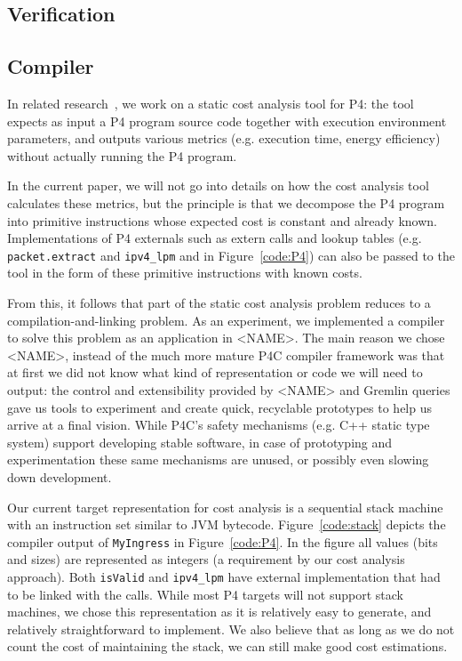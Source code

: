 \documentclass[sigconf]{acmart}
\begin{document}
	\subsection{Verification} %

  \clearpage
  \subsection{Compiler} %
  In related research~\cite{cscs18,ocs20}, we work on a static cost analysis tool for P4: the tool expects as input a P4 program source code together with execution environment parameters, and outputs various metrics (e.g. execution time, energy efficiency) without actually running the P4 program.

  In the current paper, we will not go into details on how the cost analysis tool calculates these metrics, but the principle is that we decompose the P4 program into primitive instructions whose expected cost is constant and already known. Implementations of P4 externals such as extern calls and lookup tables (e.g. \texttt{packet.extract} and \texttt{ipv4\_lpm} and in Figure~\ref{code:P4}) can also be passed to the tool in the form of these primitive instructions with known costs. 

  From this, it follows that part of the static cost analysis problem reduces to a compilation-and-linking problem. As an experiment, we implemented a compiler to solve this problem as an application in <NAME>. The main reason we chose <NAME>, instead of the much more mature P4C compiler framework was that at first we did not know what kind of representation or code we will need to output: the control and extensibility provided by <NAME> and Gremlin queries gave us tools to experiment and create quick, recyclable prototypes to help us arrive at a final vision. While P4C's safety mechanisms (e.g. C++ static type system) support developing stable software, in case of prototyping and experimentation these same mechanisms are unused, or possibly even slowing down development.

  Our current target representation for cost analysis is a sequential stack machine with an instruction set similar to JVM bytecode. Figure~\ref{code:stack} depicts the compiler output of \texttt{MyIngress} in Figure~\ref{code:P4}. In the figure all values (bits and sizes) are represented as integers (a requirement by our cost analysis approach). Both \texttt{isValid} and \texttt{ipv4\_lpm} have external implementation that had to be linked with the calls. While most P4 targets will not support stack machines, we chose this representation as it is relatively easy to generate, and relatively straightforward to implement. We also believe that as long as we do not count the cost of maintaining the stack, we can still make good cost estimations.
  
\end{document}
